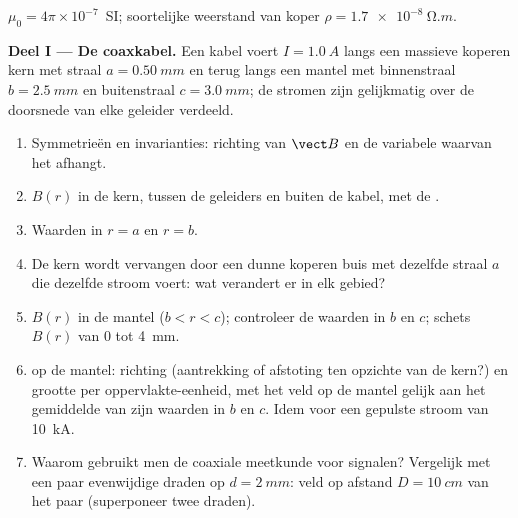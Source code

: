 \begin{problem}
\label{pb:b1:magnetostatics:1}
$\mu_0 = 4\pi \times 10^{-7}$~SI; soortelijke weerstand van koper $\rho = \qty{1.7e-8}{\ohm.m}$.

\medskip
\noindent\textbf{Deel I --- De coaxkabel.}
Een kabel voert $I = \qty{1.0}{A}$ langs een massieve koperen kern met straal
$a = \qty{0.50}{mm}$ en terug langs een mantel met binnenstraal $b =
\qty{2.5}{mm}$ en buitenstraal $c = \qty{3.0}{mm}$; de stromen zijn gelijkmatig
over de doorsnede van elke geleider verdeeld.
\begin{enumerate}
  \item Symmetrieën en invarianties: richting van $\vect B$ en de
        variabele waarvan het afhangt.
  \item $B(r)$ in de kern, tussen de geleiders en buiten de
        kabel, met de .
  \item Waarden in $r = a$ en $r = b$.
  \item De kern wordt vervangen door een dunne koperen buis met dezelfde straal
        $a$ die dezelfde stroom voert: wat verandert er in elk gebied?
  \item $B(r)$ in de mantel ($b < r < c$); controleer de waarden in $b$
        en $c$; schets $B(r)$ van $0$ tot \qty{4}{mm}.
  \item {} op de mantel: richting (aantrekking of
        afstoting ten opzichte van de kern?) en grootte per oppervlakte-eenheid, met
        het veld op de mantel gelijk aan het gemiddelde van zijn waarden in $b$ en $c$.
        Idem voor een gepulste stroom van \qty{10}{kA}.
  \item Waarom gebruikt men de coaxiale meetkunde voor signalen? Vergelijk met een
        paar evenwijdige draden op $d = \qty{2}{mm}$: veld op afstand
        $D = \qty{10}{cm}$ van het paar (superponeer twee draden).
\end{enumerate}


\end{problem}
